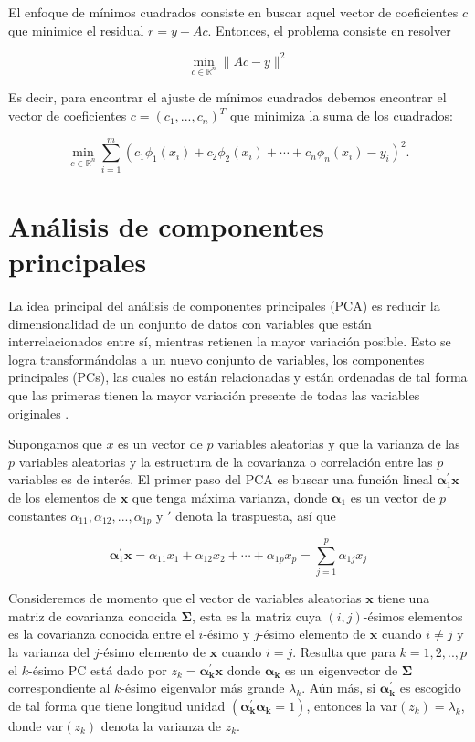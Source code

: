 El enfoque de mínimos cuadrados consiste en buscar aquel vector de coeficientes $c$ que minimice el residual $r=y-Ac$. Entonces, el problema consiste en resolver 

\[
\min _{c \in \mathbb{R}^{n}}\|A c-y\|^{2}
\]

Es decir, para encontrar el ajuste de mínimos cuadrados debemos encontrar el vector de coeficientes $c=(c_1,...,c_n)^T$ que minimiza la suma de los cuadrados:

\[
\min _{c \in \mathbb{R}^{n}} \sum_{i=1}^{m}\left(c_{1} \phi_{1}\left(x_{i}\right)+c_{2} \phi_{2}\left(x_{i}\right)+\cdots+c_{n} \phi_{n}\left(x_{i}\right)-y_{i}\right)^{2}.
\]

\section{Análisis de componentes principales}

La idea principal del análisis de componentes principales (PCA) es reducir la dimensionalidad de un conjunto de datos con variables que están interrelacionados entre sí, mientras retienen la mayor variación posible. Esto se logra transformándolas a un nuevo conjunto de variables, los componentes principales (PCs), las cuales no están relacionadas y están ordenadas de tal forma que las primeras tienen la mayor variación presente de todas las variables originales \parencite{jolliffePrincipalComponentAnalysis2002}.

Supongamos que $x$ es un vector de $p$ variables aleatorias y que la varianza de las $p$ variables aleatorias y la estructura de la covarianza o correlación entre las $p$ variables es de interés. El primer paso del PCA es buscar una función lineal $\boldsymbol{\alpha}_1^\prime \boldsymbol{x}$ de los elementos de $\boldsymbol{x}$ que tenga máxima varianza, donde $\boldsymbol{\alpha}_{1}$ es un vector de $p$ constantes $\alpha_{11},\alpha_{12},...,\alpha_{1p}$ y $\prime$ denota la traspuesta, así que

\[
\boldsymbol{\alpha}_{1}^{\prime} \boldsymbol{x}=\alpha_{11} x_{1}+\alpha_{12} x_{2}+\cdots+\alpha_{1 p} x_{p}=\sum_{j=1}^{p} \alpha_{1 j} x_{j}
\] 

Consideremos de momento que el vector de variables aleatorias $\boldsymbol{x}$ tiene una matriz de covarianza conocida $\boldsymbol{\Sigma}$, esta es la matriz cuya $(i,j)$-ésimos elementos es la covarianza conocida entre el $i$-ésimo y $j$-ésimo elemento de $\boldsymbol{x}$ cuando $i \neq j$ y la varianza del $j$-ésimo elemento de $\boldsymbol{x}$ cuando $i = j$. Resulta que para $k=1,2,..,p$ el $k$-ésimo PC está dado por $z_k = \boldsymbol{\alpha_k^\prime} \boldsymbol{x}$ donde $\boldsymbol{\alpha_k}$ es un eigenvector de $\boldsymbol{\Sigma}$ correspondiente al $k$-ésimo eigenvalor más grande $\lambda_k$. Aún más, si $\boldsymbol{\alpha_k^\prime}$ es escogido de tal forma que tiene longitud unidad $(\boldsymbol{\alpha_k^\prime}\boldsymbol{\alpha_k}=1)$, entonces la var$(z_k)=\lambda_k$, donde var$(z_k)$ denota la varianza de $z_k$.

